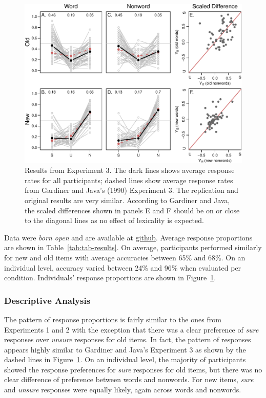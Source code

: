 \documentclass[english,,man]{apa6}
\begin{document}
\begin{figure}
\centering
\includegraphics{p_jou_files/figure-latex/results-3-1.pdf}
\caption{\label{fig:results-3}Results from Experiment 3. The dark lines shows average response rates for all participants; dashed lines show average response rates from Gardiner and Java's (1990) Experiment 3. The replication and original results are very similar. According to Gardiner and Java, the scaled differences shown in panels E and F should be on or close to the diagonal lines as no effect of lexicality is expected.}
\end{figure}

Data were \emph{born open} and are available at \href{https://github.com/PerceptionCognitionLab/data1/tree/master/repGardinerJava/exp2/RKN_replication/RKN_exp2/SU}{github}.
Average response proportions are shown in Table~\ref{tab:tab-results}. On average, participants performed similarly for new and old items with average accuracies between 65\% and 68\%. On an individual level, accuracy varied between 24\% and 96\% when evaluated per condition. Individuals' response proportions are shown in Figure~\ref{fig:results-3}.

\hypertarget{descriptive-analysis-2}{%
\subsubsection{Descriptive Analysis}\label{descriptive-analysis-2}}

The pattern of response proportions is fairly similar to the ones from Experiments 1 and 2 with the exception that there was a clear preference of \emph{sure} responses over \emph{unsure} responses for old items. In fact, the pattern of responses appears highly similar to Gardiner and Java's Experiment 3 as shown by the dashed lines in Figure~\ref{fig:results-3}. On an individual level, the majority of participants showed the response preferences for \emph{sure} responses for old items, but there was no clear difference of preference between words and nonwords. For new items, \emph{sure} and \emph{unsure} responses were equally likely, again across words and nonwords.
\end{document}
